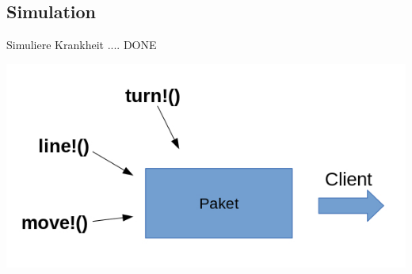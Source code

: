 \subsection{Simulation}

\begin{frame}
Simuliere Krankheit .... DONE
\end{frame}


\begin{frame}
	\begin{center}
		\includegraphics[scale=0.5]{simulation/Pakete.jpg}
	\end{center}
\end{frame}


